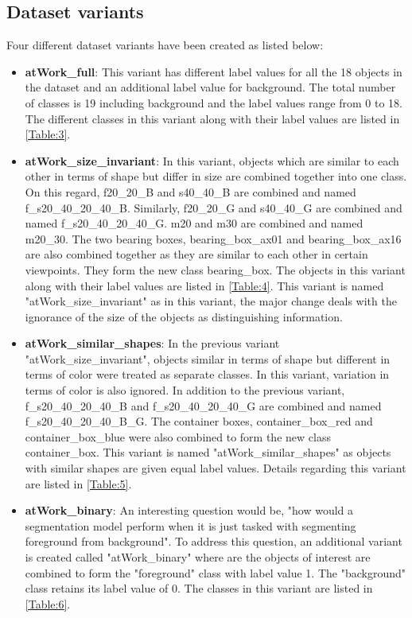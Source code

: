 \documentclass[paper=a4,11pt,parskip=half,toc=listof]{scrartcl}
\begin{document}
	\subsection{Dataset variants}
	Four different dataset variants have been created as listed below:
	\begin{itemize}
		\item \textbf{atWork\_full}: This variant has different label values for all the 18 objects in the dataset and an additional label value for background. The total number of classes is 19 including background and the label values range from 0 to 18. The different classes in this variant along with their label values are listed in \ref{Table:3}.
		\item \textbf{atWork\_size\_invariant}: In this variant, objects which are similar to each other in terms of shape but differ in size are combined together into one class. On this regard, f20\_20\_B and s40\_40\_B are combined and named f\_s20\_40\_20\_40\_B. Similarly, f20\_20\_G and s40\_40\_G are combined and named f\_s20\_40\_20\_40\_G. m20 and m30 are combined and named m20\_30. The two bearing boxes, bearing\_box\_ax01 and bearing\_box\_ax16 are also combined together as they are similar to each other in certain viewpoints. They form the new class bearing\_box. The objects in this variant along with their label values are listed in \ref{Table:4}. This variant is named "atWork\_size\_invariant" as in this variant, the major change deals with the ignorance of the size of the objects as distinguishing information.
		\item \textbf{atWork\_similar\_shapes}: In the previous variant "atWork\_size\_invariant", objects similar in terms of shape but different in terms of color were treated as separate classes. In this variant, variation in terms of color is also ignored. In addition to the previous variant, f\_s20\_40\_20\_40\_B and f\_s20\_40\_20\_40\_G are combined and named f\_s20\_40\_20\_40\_B\_G. The container boxes, container\_box\_red and container\_box\_blue were also combined to form the new class container\_box. This variant is named "atWork\_similar\_shapes" as objects with similar shapes are given equal label values. Details regarding this variant are listed in \ref{Table:5}.
		\item \textbf{atWork\_binary}: An interesting question would be, "how would a segmentation model perform when it is just tasked with segmenting foreground from background". To address this question, an additional variant is created called "atWork\_binary" where are the objects of interest are combined to form the "foreground" class with label value 1. The "background" class retains its label value of 0. The classes in this variant are listed in \ref{Table:6}.
		

\end{itemize}
\end{document}
